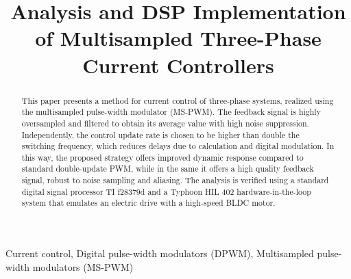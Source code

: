 \documentclass[conference]{IEEEtran}
\begin{document}
\title{Analysis and DSP Implementation of Multisampled Three-Phase Current Controllers}

\maketitle

\begin{abstract}
This paper presents a method for current control of three-phase systems, realized using the multisampled pulse-width modulator (MS-PWM). The feedback signal is highly oversampled and filtered to obtain its average value with high noise suppression. Independently, the control update rate is chosen to be higher than double the switching frequency, which reduces delays due to calculation and digital modulation. In this way, the proposed strategy offers improved dynamic response compared to standard double-update PWM, while in the same it offers a high quality feedback signal, robust to noise sampling and aliasing.
The analysis is verified using a standard digital signal processor TI f28379d and a Typhoon HIL 402 hardware-in-the-loop system that emulates an electric drive with a high-speed BLDC motor.
\end{abstract}

\begin{IEEEkeywords}
Current control, Digital pulse-width modulators (DPWM), Multisampled pulse-width modulators (MS-PWM)
\end{IEEEkeywords}


\IEEEpeerreviewmaketitle
\end{document}
